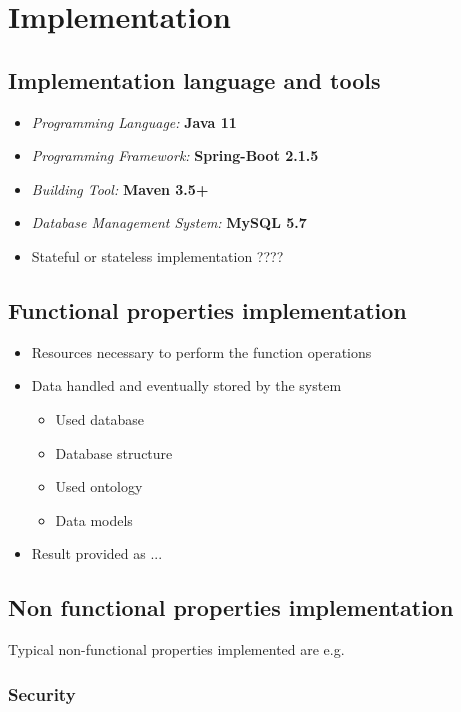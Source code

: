 \documentclass[a4paper]{arrowhead}
\begin{document}
\newpage

\section{Implementation}
\label{Implementation}

\subsection {Implementation language and tools}


\begin{itemize}
\item \emph{Programming Language:} \textbf{Java 11}
\item \emph{Programming Framework:} \textbf{Spring-Boot 2.1.5}
\item \emph{Building Tool:} \textbf{Maven 3.5+}
\item \emph{Database Management System:} \textbf{MySQL 5.7}
\color{red}
\item Stateful or stateless implementation ???? 
\end{itemize} 
\color{black}

\subsection {Functional properties implementation}
\color{red}
  \begin{itemize}
  \item Resources necessary to perform the function operations
  \item Data handled and eventually stored by the system
    \begin{itemize}
    \item Used database
    \item Database structure
    \item Used ontology
    \item Data models
    \end{itemize}
  \item Result provided as ...
  \end{itemize}
\color{black}

\subsection {Non functional properties implementation}
\color{red}
Typical non-functional properties implemented are e.g.
\subsubsection {Security}
\end{document}

